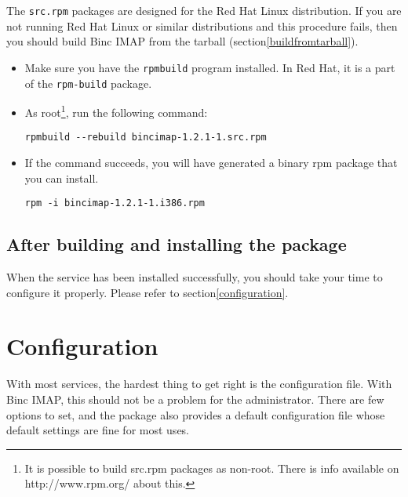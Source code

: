 \documentclass[11pt,a4paper,twoside,openright]{report}
\begin{document}
The \texttt{src.rpm} packages are designed for the Red Hat Linux
distribution. If you are not running Red Hat Linux or similar
distributions and this procedure fails, then you should build Binc
IMAP from the tarball (section\vref{buildfromtarball}).

\begin{itemize}

\item Make sure you have the \texttt{rpmbuild} program installed. In
Red Hat, it is a part of the \texttt{rpm-build} package.

\item As root\footnote{It is possible to build src.rpm packages as
non-root. There is info available on http://www.rpm.org/
about this.}, run the following command:

\begin{Verbatim}
rpmbuild --rebuild bincimap-1.2.1-1.src.rpm
\end{Verbatim}

\item If the command succeeds, you will have generated a binary rpm
package that you can install.

\begin{Verbatim}
rpm -i bincimap-1.2.1-1.i386.rpm
\end{Verbatim}

\end{itemize}

\section{After building and installing the package}

When the service has been installed successfully, you should take your
time to configure it properly. Please refer to
section\vref{configuration}.

\chapter[Configuring Binc IMAP]{Configuration}
\label{configuration}

With most services, the hardest thing to get right is the
configuration file. With Binc IMAP, this should not be a problem for
the administrator. There are few options to set, and the package also
provides a default configuration file whose default settings are fine
for most uses.
\end{document}
